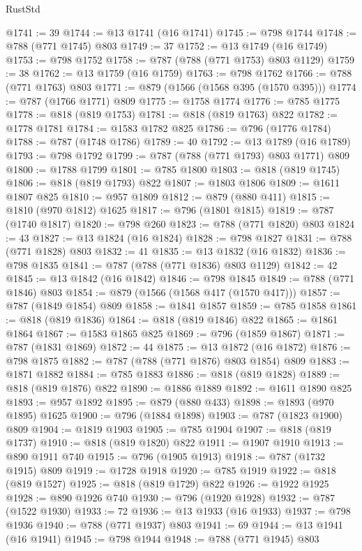\begin{lexlean}{RustStd}
\begin{coremodule}
@1741 := 39
@1744 := @13 @1741 (@16 @1741)
@1745 := @798 @1744
@1748 := @788 (@771 @1745) @803
@1749 := 37
@1752 := @13 @1749 (@16 @1749)
@1753 := @798 @1752
@1758 := @787 (@788 (@771 @1753) @803 @1129)
@1759 := 38
@1762 := @13 @1759 (@16 @1759)
@1763 := @798 @1762
@1766 := @788 (@771 @1763) @803
@1771 := @879 (@1566 (@1568 @395 (@1570 @395)))
@1774 := @787 (@1766 @1771) @809
@1775 := @1758 @1774
@1776 := @785 @1775
@1778 := @818 (@819 @1753)
@1781 := @818 (@819 @1763) @822
@1782 := @1778 @1781
@1784 := @1583 @1782 @825
@1786 := @796 (@1776 @1784)
@1788 := @787 (@1748 @1786)
@1789 := 40
@1792 := @13 @1789 (@16 @1789)
@1793 := @798 @1792
@1799 := @787 (@788 (@771 @1793) @803 @1771) @809
@1800 := @1788 @1799
@1801 := @785 @1800
@1803 := @818 (@819 @1745)
@1806 := @818 (@819 @1793) @822
@1807 := @1803 @1806
@1809 := @1611 @1807 @825
@1810 := @957 @1809
@1812 := @879 (@880 @411)
@1815 := @1810 (@970 @1812) @1625
@1817 := @796 (@1801 @1815)
@1819 := @787 (@1740 @1817)
@1820 := @798 @260
@1823 := @788 (@771 @1820) @803
@1824 := 43
@1827 := @13 @1824 (@16 @1824)
@1828 := @798 @1827
@1831 := @788 (@771 @1828) @803
@1832 := 41
@1835 := @13 @1832 (@16 @1832)
@1836 := @798 @1835
@1841 := @787 (@788 (@771 @1836) @803 @1129)
@1842 := 42
@1845 := @13 @1842 (@16 @1842)
@1846 := @798 @1845
@1849 := @788 (@771 @1846) @803
@1854 := @879 (@1566 (@1568 @417 (@1570 @417)))
@1857 := @787 (@1849 @1854) @809
@1858 := @1841 @1857
@1859 := @785 @1858
@1861 := @818 (@819 @1836)
@1864 := @818 (@819 @1846) @822
@1865 := @1861 @1864
@1867 := @1583 @1865 @825
@1869 := @796 (@1859 @1867)
@1871 := @787 (@1831 @1869)
@1872 := 44
@1875 := @13 @1872 (@16 @1872)
@1876 := @798 @1875
@1882 := @787 (@788 (@771 @1876) @803 @1854) @809
@1883 := @1871 @1882
@1884 := @785 @1883
@1886 := @818 (@819 @1828)
@1889 := @818 (@819 @1876) @822
@1890 := @1886 @1889
@1892 := @1611 @1890 @825
@1893 := @957 @1892
@1895 := @879 (@880 @433)
@1898 := @1893 (@970 @1895) @1625
@1900 := @796 (@1884 @1898)
@1903 := @787 (@1823 @1900) @809
@1904 := @1819 @1903
@1905 := @785 @1904
@1907 := @818 (@819 @1737)
@1910 := @818 (@819 @1820) @822
@1911 := @1907 @1910
@1913 := @890 @1911 @740
@1915 := @796 (@1905 @1913)
@1918 := @787 (@1732 @1915) @809
@1919 := @1728 @1918
@1920 := @785 @1919
@1922 := @818 (@819 @1527)
@1925 := @818 (@819 @1729) @822
@1926 := @1922 @1925
@1928 := @890 @1926 @740
@1930 := @796 (@1920 @1928)
@1932 := @787 (@1522 @1930)
@1933 := 72
@1936 := @13 @1933 (@16 @1933)
@1937 := @798 @1936
@1940 := @788 (@771 @1937) @803
@1941 := 69
@1944 := @13 @1941 (@16 @1941)
@1945 := @798 @1944
@1948 := @788 (@771 @1945) @803

\end{coremodule}
\end{lexlean}
